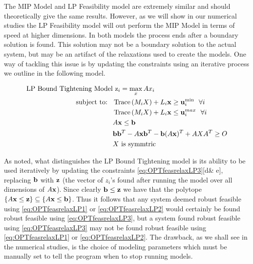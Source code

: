 The MIP Model and LP Feasibility model are extremely similar and should theoretically give the same results. 
However, as we will show in our numerical studies the LP Feasibility model will out perform the MIP Model in terms of speed at higher dimensions. 
In both models the process ends after a boundary solution is found. 
This solution may not be a boundary solution to the actual system, but may be an artifact of the relaxations used to create the models. 
One way of tackling this issue is by updating the constraints using an iterative process we outline in the following model.
 
\begin{subequations}\label{eq:OPTfeasrelaxLP3}
\begin{align}
\text{LP Bound Tightening Model}& \ \mathrm{z}_{i} = \max_x Ax_i  \\
 \text{subject to: } \ &\operatorname{Trace}\left(M_iX\right)+ L_i\mathbf{x} \geq \mathbf{u}_i^{\min}  \ \ \forall i\\
 & \operatorname{Trace}\left(M_iX\right)+ L_i\mathbf{x} \leq \mathbf{u}_i^{max}  \ \ \forall i\\
 	&A\mathbf{x}\leq \mathbf{b} \\
 	&\mathbf{b}\mathbf{b}^T-A\mathbf{x}\mathbf{b}^T-\mathbf{b}(A\mathbf{x})^T+AXA^T\geq O \\
 	&X \text{ is symmtric}
\end{align}
\end{subequations}

As noted, what distinguishes the LP Bound Tightening model is its ability to be used iteratively by updating the constraints \eqref{eq:OPTfeasrelaxLP3}[d\& e], replacing $\mathbf{b}$ with $\mathbf{z}$ (the vector of $z_i$'s found after running the model over all dimensions of $A\mathbf{x}$). 
Since clearly $\mathbf{b}\leq \mathbf{z}$ we have that the polytope $\{A\mathbf{x}\leq \mathbf{z}\}\subseteq\{A\mathbf{x}\leq \mathbf{b}\}$. 
Thus it follows that any system deemed robust feasible using \eqref{eq:OPTfeasrelaxLP1} or \eqref{eq:OPTfeasrelaxLP2} would certainly be found robust feasible using \eqref{eq:OPTfeasrelaxLP3}, but a system found robust feasible using \eqref{eq:OPTfeasrelaxLP3} may not be found robust feasible using \eqref{eq:OPTfeasrelaxLP1} or \eqref{eq:OPTfeasrelaxLP2}. 
The drawback, as we shall see in the numerical studies, is the choice of modeling parameters which must be manually set to tell the program when to stop running models. 

